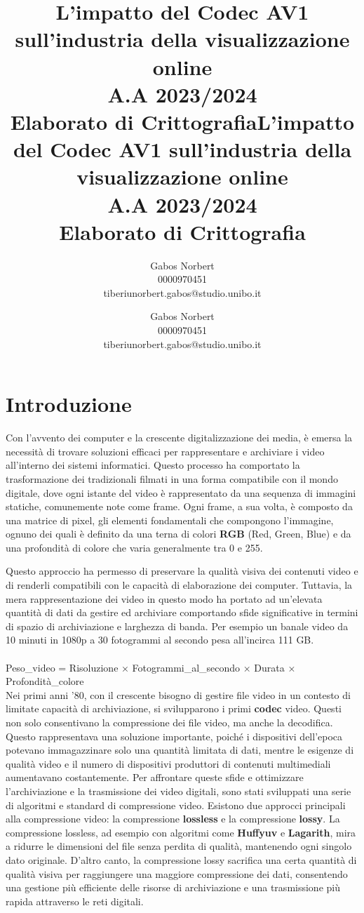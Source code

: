 \documentclass[a4paper,12pt, oneside]{article}
\title{\textbf{L'impatto del Codec AV1 sull'industria della visualizzazione online} \\ \large A.A 2023/2024 \\ Elaborato di Crittografia}
\author{Gabos Norbert \\ 0000970451 \\ tiberiunorbert.gabos@studio.unibo.it }
\date{}
\title{\textbf{L'impatto del Codec AV1 sull'industria della visualizzazione online} \\ \large A.A 2023/2024 \\ Elaborato di Crittografia}
\author{Gabos Norbert \\ 0000970451 \\ tiberiunorbert.gabos@studio.unibo.it }
\date{}
\begin{document}
\maketitle

\newpage
\tableofcontents{}
\newpage

\section{Introduzione}
Con l'avvento dei computer e la crescente digitalizzazione dei media, è emersa la necessità di
trovare soluzioni efficaci per rappresentare e archiviare i video all'interno dei sistemi
informatici. Questo processo ha comportato la trasformazione dei tradizionali filmati in una
forma compatibile con il mondo digitale, dove ogni istante del video è rappresentato da una
sequenza di immagini statiche, comunemente note come frame. Ogni frame, a sua volta, è
composto da una matrice di pixel, gli elementi fondamentali che compongono l'immagine, ognuno
dei quali è definito da una terna di colori \textbf{RGB} (Red, Green, Blue) e da una profondità
di colore che varia generalmente tra 0 e 255.

Questo approccio ha permesso di preservare la qualità visiva dei contenuti video e di renderli
compatibili con le capacità di elaborazione dei computer. Tuttavia, la mera rappresentazione
dei video in questo modo ha portato ad un'elevata quantità di dati da gestire ed archiviare
comportando sfide significative in termini di spazio di archiviazione e larghezza di banda.
Per esempio un banale video da 10 minuti in 1080p a 30 fotogrammi al secondo pesa
all'incirca 111 GB.
\noindent
\\\\Peso\_video = Risoluzione × Fotogrammi\_al\_secondo × Durata × Profondità\_colore\\

Nei primi anni '80, con il crescente bisogno di gestire file video in un contesto di limitate
capacità di archiviazione, si svilupparono i primi \textbf{codec} video. Questi non solo consentivano
la compressione dei file video, ma anche la decodifica. Questo rappresentava una soluzione
importante, poiché i dispositivi dell'epoca potevano immagazzinare solo una quantità limitata
di dati, mentre le esigenze di qualità video e il numero di dispositivi produttori di contenuti
multimediali aumentavano costantemente.
Per affrontare queste sfide e ottimizzare l'archiviazione e la trasmissione dei video
digitali, sono stati sviluppati una serie di algoritmi e standard di compressione video.
Esistono due approcci principali alla compressione video: la compressione \textbf{lossless} e
la compressione \textbf{lossy}. La compressione lossless, ad esempio con algoritmi come
\textbf{Huffyuv} e \textbf{Lagarith}, mira a ridurre le dimensioni del file senza perdita di
qualità, mantenendo ogni singolo dato originale. D'altro canto, la compressione lossy
sacrifica una certa quantità di qualità visiva per raggiungere una maggiore compressione dei
dati, consentendo una gestione più efficiente delle risorse di archiviazione e una
trasmissione più rapida attraverso le reti digitali.
\end{document}
